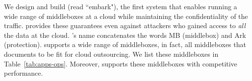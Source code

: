 %    
%    
% 
     
     
     
  
    We design and build \sys (read ``embark"), the first system that enables running a wide range of middleboxes at a cloud  while maintaining the confidentiality of the traffic. \sys provides these guarantees even against attackers who gained access to {\em all} the data at the cloud.  \sys's name concatenates the words MB (middlebox) and Ark (protection). \sys supports a wide range of middleboxes, in fact, all middleboxes that~\cite{aplomb} documents to be fit for cloud outsourcing. We list these middleboxes in Table~\ref{tab:apps-ops}. Moreover, \sys supports these middleboxes with competitive performance. 
    
